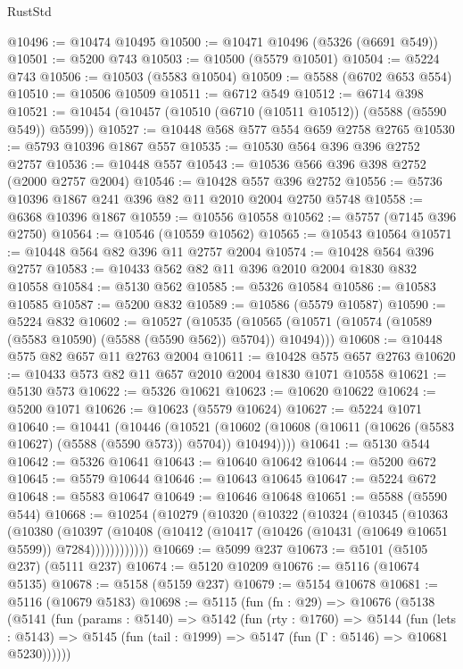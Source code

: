\begin{lexlean}{RustStd}
\begin{coremodule}
{\begin{coremodule}
{{{{{{{{{{{{{{{{{{{{{{{{{{{{{{{@10496 := @10474 @10495
@10500 := @10471 @10496 (@5326 (@6691 @549))
@10501 := @5200 @743
@10503 := @10500 (@5579 @10501)
@10504 := @5224 @743
@10506 := @10503 (@5583 @10504)
@10509 := @5588 (@6702 @653 @554)
@10510 := @10506 @10509
@10511 := @6712 @549
@10512 := @6714 @398
@10521 := @10454 (@10457 (@10510 (@6710 (@10511 @10512)) (@5588 (@5590 @549)) @5599))
@10527 := @10448 @568 @577 @554 @659 @2758 @2765
@10530 := @5793 @10396 @1867 @557
@10535 := @10530 @564 @396 @396 @2752 @2757
@10536 := @10448 @557
@10543 := @10536 @566 @396 @398 @2752 (@2000 @2757 @2004)
@10546 := @10428 @557 @396 @2752
@10556 := @5736 @10396 @1867 @241 @396 @82 @11 @2010 @2004 @2750 @5748
@10558 := @6368 @10396 @1867
@10559 := @10556 @10558
@10562 := @5757 (@7145 @396 @2750)
@10564 := @10546 (@10559 @10562)
@10565 := @10543 @10564
@10571 := @10448 @564 @82 @396 @11 @2757 @2004
@10574 := @10428 @564 @396 @2757
@10583 := @10433 @562 @82 @11 @396 @2010 @2004 @1830 @832 @10558
@10584 := @5130 @562
@10585 := @5326 @10584
@10586 := @10583 @10585
@10587 := @5200 @832
@10589 := @10586 (@5579 @10587)
@10590 := @5224 @832
@10602 := @10527
    (@10535 (@10565 (@10571 (@10574 (@10589 (@5583 @10590) (@5588 (@5590 @562)) @5704)) @10494)))
@10608 := @10448 @575 @82 @657 @11 @2763 @2004
@10611 := @10428 @575 @657 @2763
@10620 := @10433 @573 @82 @11 @657 @2010 @2004 @1830 @1071 @10558
@10621 := @5130 @573
@10622 := @5326 @10621
@10623 := @10620 @10622
@10624 := @5200 @1071
@10626 := @10623 (@5579 @10624)
@10627 := @5224 @1071
@10640 := @10441
    (@10446
      (@10521 (@10602 (@10608 (@10611 (@10626 (@5583 @10627) (@5588 (@5590 @573)) @5704)) @10494))))
@10641 := @5130 @544
@10642 := @5326 @10641
@10643 := @10640 @10642
@10644 := @5200 @672
@10645 := @5579 @10644
@10646 := @10643 @10645
@10647 := @5224 @672
@10648 := @5583 @10647
@10649 := @10646 @10648
@10651 := @5588 (@5590 @544)
@10668 := @10254
    (@10279
      (@10320
        (@10322
          (@10324
            (@10345
              (@10363
                (@10380
                  (@10397
                    (@10408 (@10412 (@10417 (@10426 (@10431 (@10649 @10651 @5599)) @7284))))))))))))
@10669 := @5099 @237
@10673 := @5101 (@5105 @237) (@5111 @237)
@10674 := @5120 @10209
@10676 := @5116 (@10674 @5135)
@10678 := @5158 (@5159 @237)
@10679 := @5154 @10678
@10681 := @5116 (@10679 @5183)
@10698 := @5115
    (fun (fn : @29) =>
    @10676
      (@5138
        (@5141
          (fun (params : @5140) =>
          @5142
            (fun (rty : @1760) =>
            @5144
              (fun (lets : @5143) =>
              @5145 (fun (tail : @1999) => @5147 (fun (Γ : @5146) => @10681 @5230))))))
}}}}}}}}}}}}}}}}}}}}}}}}}}}}}}}
\end{coremodule}}
\end{coremodule}
\end{lexlean}
